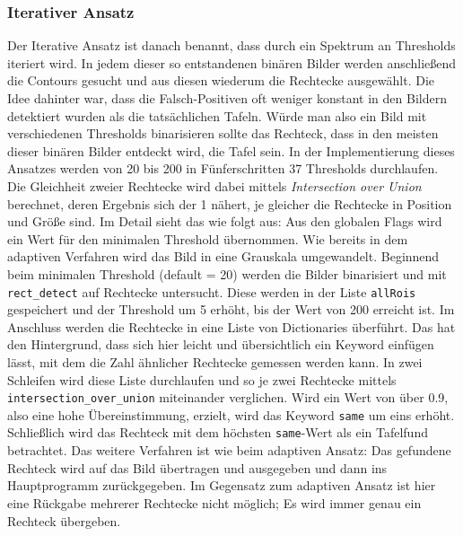 \subsubsection*{Iterativer Ansatz}
Der Iterative Ansatz ist danach benannt, dass durch ein Spektrum an Thresholds iteriert wird. In jedem dieser so entstandenen binären Bilder werden anschließend die Contours gesucht und aus diesen wiederum die Rechtecke ausgewählt. Die Idee dahinter war, dass die Falsch-Positiven oft weniger konstant in den Bildern detektiert wurden als die tatsächlichen Tafeln. Würde man also ein Bild mit verschiedenen Thresholds binarisieren sollte das Rechteck, dass in den meisten dieser binären Bilder entdeckt wird, die Tafel sein. In der Implementierung dieses Ansatzes werden von 20 bis 200 in Fünferschritten 37 Thresholds durchlaufen. Die Gleichheit zweier Rechtecke wird dabei mittels \textit{Intersection over Union} berechnet, deren Ergebnis sich der 1 nähert, je gleicher die Rechtecke in Position und Größe sind. Im Detail sieht das wie folgt aus: Aus den globalen Flags wird ein Wert für den minimalen Threshold übernommen. Wie bereits in dem adaptiven Verfahren wird das Bild in eine Grauskala umgewandelt. Beginnend beim minimalen Threshold (default = 20) werden die Bilder binarisiert und mit \verb|rect_detect| auf Rechtecke untersucht. Diese werden in der Liste \verb|allRois| gespeichert und der Threshold um 5 erhöht, bis der Wert von 200 erreicht ist.
Im Anschluss werden die Rechtecke in eine Liste von Dictionaries überführt. Das hat den Hintergrund, dass sich hier leicht und übersichtlich ein Keyword einfügen lässt, mit dem die Zahl ähnlicher Rechtecke gemessen werden kann. In zwei Schleifen wird diese Liste durchlaufen und so je zwei Rechtecke mittels \verb|intersection_over_union| miteinander verglichen. Wird ein Wert von über 0.9, also eine hohe Übereinstimmung, erzielt, wird das Keyword \verb|same| um eins erhöht.
Schließlich wird das Rechteck mit dem höchsten \verb|same|-Wert als ein Tafelfund betrachtet. Das weitere Verfahren ist wie beim adaptiven Ansatz: Das gefundene Rechteck wird auf das Bild übertragen und ausgegeben und dann ins Hauptprogramm zurückgegeben. Im Gegensatz zum adaptiven Ansatz ist hier eine Rückgabe mehrerer Rechtecke nicht möglich; Es wird immer genau ein Rechteck übergeben.
